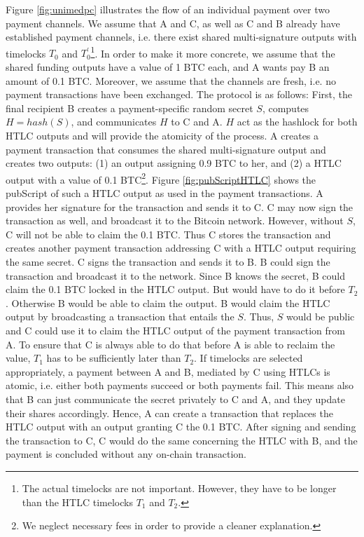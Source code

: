 Figure \ref{fig:unimedpc} illustrates the flow of an individual payment over two payment channels. We assume that A and C, as well as C and B already have established payment channels, i.e. there exist shared multi-signature outputs with timelocks $T_0$ and $T_0^{'}$\footnote{The actual timelocks are not important. However, they have to be longer than the \ac{HTLC} timelocks $T_1$ and $T_2$.}. In order to make it more concrete, we assume that the shared funding outputs have a value of 1 BTC each, and A wants pay B an amount of 0.1 BTC. Moreover, we assume that the channels are fresh, i.e. no payment transactions have been exchanged. The protocol is as follows: First, the final recipient B creates a payment-specific random secret $S$, computes $H=hash(S)$, and communicates $H$ to C and A. $H$ act as the hashlock for both \ac{HTLC} outputs and will provide the atomicity of the process. A creates a payment transaction that consumes the shared multi-signature output and creates two outputs: (1) an output assigning 0.9 BTC to her, and (2) a \ac{HTLC} output with a value of 0.1 BTC\footnote{We neglect necessary fees in order to provide a cleaner explanation.}. Figure \ref{fig:pubScriptHTLC} shows the pubScript of such a \ac{HTLC} output as used in the payment transactions. A provides her signature for the transaction and sends it to C. C may now sign the transaction as well, and broadcast it to the Bitcoin network. However, without $S$, C will not be able to claim the 0.1 BTC. Thus C stores the transaction and creates another payment transaction addressing C with a \ac{HTLC} output requiring the same secret. C signs the transaction and sends it to B. B could sign the transaction and broadcast it to the network. Since B knows the secret, B could claim the 0.1 BTC locked in the \ac{HTLC} output. But would have to do it before $T_2$. Otherwise B would be able to claim the output. B would claim the \ac{HTLC} output by broadcasting a transaction that entails the $S$. Thus, $S$ would be public and C could use it to claim the \ac{HTLC} output of the payment transaction from A. To ensure that C is always able to do that before A is able to reclaim the value, $T_1$ has to be sufficiently later than $T_2$. If timelocks are selected appropriately, a payment between A and B, mediated by C using \ac{HTLC}s is atomic, i.e. either both payments succeed or both payments fail. This means also that B can just communicate the secret privately to C and A, and they update their shares accordingly. Hence, A can create a transaction that replaces the \ac{HTLC} output with an output granting C the 0.1 BTC. After signing and sending the transaction to C, C would do the same concerning the \ac{HTLC} with B, and the payment is concluded without any on-chain transaction.

